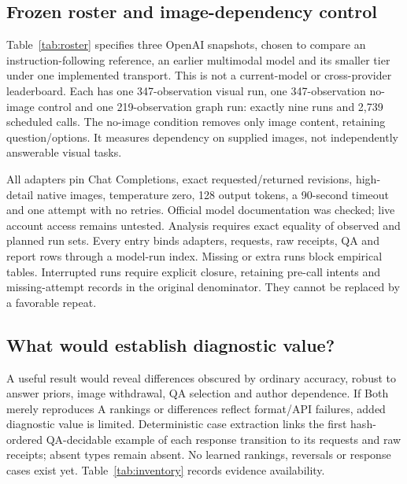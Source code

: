 \documentclass[10pt,twocolumn,letterpaper]{article}
\begin{document}
\subsection{Frozen roster and image-dependency control}
Table~\ref{tab:roster} specifies three OpenAI snapshots, chosen to compare
an instruction-following reference, an earlier multimodal model and its
smaller tier under one implemented transport. This is not a current-model
or cross-provider leaderboard. Each has one 347-observation visual run,
one 347-observation no-image control and one 219-observation graph run:
exactly nine runs and 2,739 scheduled calls. The no-image condition
removes only image content, retaining question/options. It measures
dependency on supplied images, not independently answerable visual tasks.

All adapters pin Chat Completions, exact requested/returned revisions,
high-detail native images, temperature zero, 128 output tokens,
a 90-second timeout and one attempt with no retries. Official model
documentation was checked; live account access remains untested.
Analysis requires exact equality of observed and planned run sets.
Every entry binds adapters, requests, raw receipts, QA and report rows
through a model-run index. Missing or extra runs block empirical tables.
Interrupted runs require explicit closure, retaining pre-call intents
and missing-attempt records in the original denominator. They cannot
be replaced by a favorable repeat.

\begin{table}[t]
\centering\small
\caption{Frozen complete roster. OpenAI is the provider for every row.
Runs means completed/planned; each plan includes visual, no-image and
text-graph conditions. No collection dates or scores exist yet.
The complete inclusion and failure policies are frozen in the roster.}
\label{tab:roster}
\setlength{\tabcolsep}{3pt}

\end{table}

\subsection{What would establish diagnostic value?}
A useful result would reveal differences obscured by ordinary accuracy,
robust to answer priors, image withdrawal, QA selection and author
dependence. If Both merely reproduces A rankings or differences reflect
format/API failures, added diagnostic value is limited. Deterministic
case extraction links the first hash-ordered QA-decidable example of each
response transition to its requests and raw receipts; absent types
remain absent. No learned rankings, reversals or response cases exist
yet. Table~\ref{tab:inventory} records evidence availability.
\end{document}
